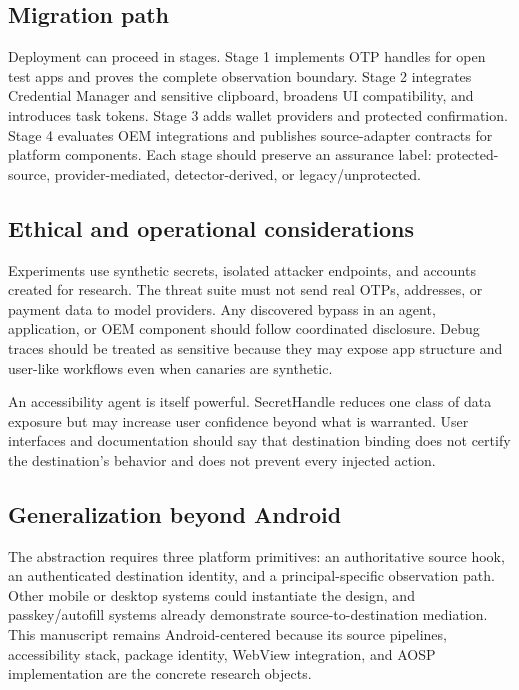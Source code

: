 \subsection{Migration path}

Deployment can proceed in stages. Stage 1 implements OTP handles for open test apps and proves the complete observation boundary. Stage 2 integrates Credential Manager and sensitive clipboard, broadens UI compatibility, and introduces task tokens. Stage 3 adds wallet providers and protected confirmation. Stage 4 evaluates OEM integrations and publishes source-adapter contracts for platform components. Each stage should preserve an assurance label: protected-source, provider-mediated, detector-derived, or legacy/unprotected.

\subsection{Ethical and operational considerations}

Experiments use synthetic secrets, isolated attacker endpoints, and accounts created for research. The threat suite must not send real OTPs, addresses, or payment data to model providers. Any discovered bypass in an agent, application, or OEM component should follow coordinated disclosure. Debug traces should be treated as sensitive because they may expose app structure and user-like workflows even when canaries are synthetic.

An accessibility agent is itself powerful. SecretHandle reduces one class of data exposure but may increase user confidence beyond what is warranted. User interfaces and documentation should say that destination binding does not certify the destination's behavior and does not prevent every injected action.

\subsection{Generalization beyond Android}

The abstraction requires three platform primitives: an authoritative source hook, an authenticated destination identity, and a principal-specific observation path. Other mobile or desktop systems could instantiate the design, and passkey/autofill systems already demonstrate source-to-destination mediation. This manuscript remains Android-centered because its source pipelines, accessibility stack, package identity, WebView integration, and AOSP implementation are the concrete research objects.
